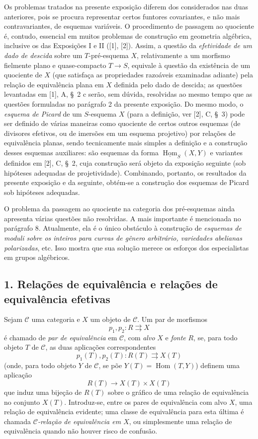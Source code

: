 \documentclass[11pt,twoside,openany]{book}
\numberwithin{equation}{section}
\newcommand{\src}[1]{%
  \phantomsection\hypertarget{src:#1}{}%
  \marginpar{\raggedleft\footnotesize\sffamily #1}%
}
\theoremstyle{plain}
\theoremstyle{definition}
\theoremstyle{remark}
\newcommand{\FgaUnitKey}{frontmatter}
\renewcommand{\src}[1]{%
  \phantomsection\hypertarget{src:\FgaUnitKey:#1}{}%
  \marginpar{\raggedleft\footnotesize\sffamily #1}%
}
\begin{document}
Os problemas tratados na presente exposição diferem dos considerados nas duas
anteriores, pois se procura representar certos funtores covariantes, e não mais
contravariantes, de esquemas variáveis. O procedimento de passagem ao quociente
é, contudo, essencial em muitos problemas de construção em geometria algébrica,
inclusive os das Exposições I e II ([1], [2]). Assim, a questão da
\emph{efetividade de um dado de descida} sobre um $T$-pré-esquema $X$,
relativamente a um morfismo fielmente plano e quase-compacto
$T\longrightarrow S$, equivale à questão da existência de um quociente de $X$
(que satisfaça as propriedades razoáveis examinadas adiante) pela relação de
equivalência plana em $X$ definida pelo dado de descida; as questões levantadas
em [1], A, \S~2 c serão, sem dúvida, resolvidas ao mesmo tempo que as questões
formuladas no parágrafo 2 da presente exposição. Do mesmo modo, o
\emph{esquema de Picard} de um $S$-esquema $X$ (para a definição, ver [2], C,
\S~3) pode ser definido de várias maneiras como quociente de certos outros
esquemas (de divisores efetivos, ou de imersões em um esquema projetivo) por
relações de equivalência planas, sendo tecnicamente mais simples a definição e
a construção desses esquemas auxiliares: são esquemas da forma
$\underline{\operatorname{Hom}}_S(X,Y)$ e variantes definidos em [2], C,
\S~2, cuja construção será objeto da exposição seguinte (sob hipóteses
adequadas de projetividade). Combinando, portanto, os resultados da presente
exposição e da seguinte, obtém-se a construção dos esquemas de Picard sob
hipóteses adequadas.

O problema da passagem ao quociente na categoria dos pré-esquemas ainda
apresenta várias questões não resolvidas. A mais importante é mencionada no
parágrafo 8. Atualmente, ela é o único obstáculo à construção de
\emph{esquemas de moduli sobre os inteiros para curvas de gênero arbitrário,
variedades abelianas polarizadas}, etc. Isso mostra que sua solução merece os
esforços dos especialistas em grupos algébricos.
\src{100}
\subsection*{1. Relações de equivalência e relações de equivalência efetivas}

Sejam $\mathcal C$ uma categoria e $X$ um objeto de $\mathcal C$. Um par de
morfismos
\[
  p_1,p_2:R\rightrightarrows X
\]
é chamado de \emph{par de equivalência} em $\mathcal C$, com \emph{alvo} $X$ e
\emph{fonte} $R$, se, para todo objeto $T$ de $\mathcal C$, as duas aplicações
correspondentes
\[
  p_1(T),p_2(T):R(T)\rightrightarrows X(T)
\]
(onde, para todo objeto $Y$ de $\mathcal C$, se põe
$Y(T)=\operatorname{Hom}(T,Y)$) definem uma aplicação
\[
  R(T)\longrightarrow X(T)\times X(T)
\]
que induz uma bijeção de $R(T)$ sobre o gráfico de uma relação de equivalência
no conjunto $X(T)$. Introduz-se, entre os pares de equivalência com alvo $X$,
uma relação de equivalência evidente; uma classe de equivalência para esta
última é chamada \emph{$\mathcal C$-relação de equivalência em $X$}, ou
simplesmente uma relação de equivalência quando não houver risco de confusão.
\end{document}
